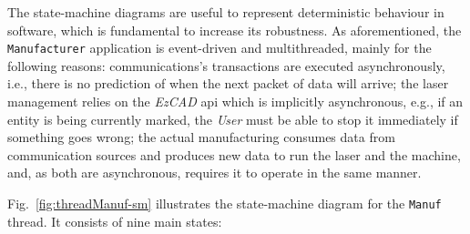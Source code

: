 The state-machine diagrams are useful to represent deterministic behaviour in
software, which is fundamental to increase its robustness. As aforementioned,
the \texttt{Manufacturer} application is event-driven and multithreaded, mainly
for the following reasons: communications's transactions are executed
asynchronously, i.e., there is no prediction of when the next packet of data
will arrive; the laser management relies on the \emph{EzCAD} \gls{api} which is
implicitly asynchronous, e.g., if an entity is being currently marked, the
\emph{User} must be able to stop it immediately if something goes wrong; the
actual manufacturing consumes data from communication sources and produces new
data to run the laser and the machine, and, as both are asynchronous, requires
it to operate in the same manner.

Fig.~\ref{fig:threadManuf-sm} illustrates the state-machine diagram for the
\texttt{Manuf} thread. It consists of nine main states:
